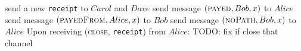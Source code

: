 \begin{algorithm}
\begin{algorithmic}[1]
          \State send a new \texttt{receipt} to $Carol$ and $Dave$
        \EndFor
        \State send message $\left(\textsc{payed}, Bob, x\right)$ to $Alice$
        \State send message $\left(\textsc{payedFrom}, Alice, x\right)$ to $Bob$
      \Else
        \State send message $\left(\textsc{noPath}, Bob, x\right)$ to $Alice$
      \EndIf
    \EndIndent
    \State
    \State Upon receiving (\textsc{close}, \texttt{receipt}) from $Alice$:
    \Indent
        \State TODO: fix if
        \State close that channel
      \EndIf
    \EndIndent
  \end{algorithmic}
\end{algorithm}
